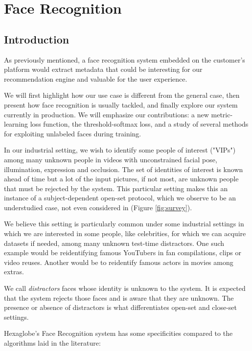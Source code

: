 \chapter{Face Recognition}
\label{chap:fr}

\section{Introduction}

As previously mentioned, a face recognition system embedded on the customer's platform would extract metadata that could be interesting for our recommendation engine and valuable for the user experience.

We will first highlight how our use case is different from the general case, then present how face recognition is usually tackled, and finally explore our system currently in production. We will emphasize our contributions: a new metric-learning loss function, the threshold-softmax loss, and a study of several methods for exploiting unlabeled faces during training.

In our industrial setting, we wish to identify some people of interest ("VIPs") among many unknown people in videos with unconstrained facial pose, illumination, expression and occlusion. The set of identities of interest is known ahead of time but a lot of the input pictures, if not most, are unknown people that must be rejected by the system. This particular setting makes this an instance of a subject-dependent open-set protocol, which we observe to be an understudied case, not even considered in \citet{survey} (Figure \ref{fig:survey}).

We believe this setting is particularly common under some industrial settings in which we are interested in some people, like celebrities, for which we can acquire datasets if needed, among many unknown test-time distractors. One such example would be reidentifying famous YouTubers in fan compilations, clips or video reuses. Another would be to reidentify famous actors in movies among extras.

We call \emph{distractors} faces whose identity is unknown to the system. It is expected that the system rejects those faces and is aware that they are unknown. The presence or absence of distractors is what differentiates open-set and close-set settings.

Hexaglobe's Face Recognition system has some specificities compared to the algorithms laid in the literature:

